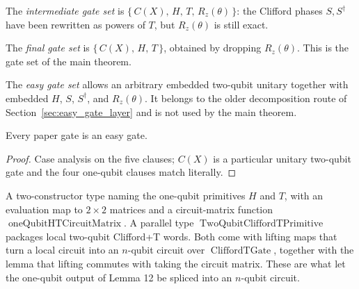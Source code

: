 \begin{definition}
  \label{def:gate_cliffordtrz}
  \leanok
  The \emph{intermediate gate set} is
  $\{\, C(X),\, H,\, T,\, R_z(\theta) \,\}$: the Clifford phases $S, S^\dagger$
  have been rewritten as powers of $T$, but $R_z(\theta)$ is still exact.
\end{definition}

\begin{definition}
  \label{def:gate_cliffordt}
  \leanok
  The \emph{final gate set} is $\{\, C(X),\, H,\, T \,\}$, obtained by
  dropping $R_z(\theta)$.  This is the gate set of the main theorem.
\end{definition}

\begin{definition}
  \label{def:gate_easy}
  \leanok
  The \emph{easy gate set} allows an arbitrary embedded two-qubit unitary
  together with embedded $H$, $S$, $S^\dagger$, and $R_z(\theta)$.  It belongs
  to the older decomposition route of Section~\ref{sec:easy_gate_layer} and is
  not used by the main theorem.
\end{definition}

\begin{lemma}
  \label{lem:cliffordrz_easy}
  \leanok
  Every paper gate is an easy gate.
\end{lemma}

\begin{proof}
  \leanok
  Case analysis on the five clauses; $C(X)$ is a particular unitary two-qubit
  gate and the four one-qubit clauses match literally.
\end{proof}

\begin{definition}
  \label{def:ht_primitive}
  \leanok
  A two-constructor type naming the one-qubit primitives $H$ and $T$, with an
  evaluation map to $2 \times 2$ matrices and a circuit-matrix function
  $\operatorname{oneQubitHTCircuitMatrix}$.  A parallel type
  $\operatorname{TwoQubitCliffordTPrimitive}$ packages local two-qubit
  Clifford+T words.  Both come with lifting maps that turn a local circuit into
  an $n$-qubit circuit over $\operatorname{CliffordTGate}$, together with the
  lemma that lifting commutes with taking the circuit matrix.  These are what
  let the one-qubit output of Lemma 12 be spliced into an $n$-qubit circuit.
\end{definition}

